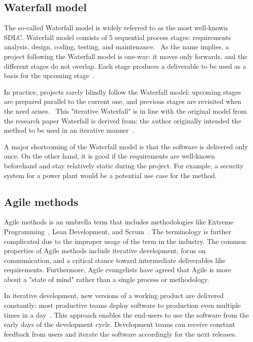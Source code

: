 \subsection{Waterfall model}

The so-called Waterfall model is widely referred to as the most well-known SDLC. Waterfall model consists of 5 sequential process stages: requirements analysis, design, coding, testing, and maintenance.~\cite{alshamrani_comparison_2015} As the name implies, a project following the Waterfall model is one-way: it moves only forwards, and the different stages do not overlap. Each stage produces a deliverable to be used as a basis for the upcoming stage~\cite{balaji_waterfall_2012}. 

In practice, projects rarely blindly follow the Waterfall model: upcoming stages are prepared parallel to the current one, and previous stages are revisited when the need arises.~\cite{sommerville_software_2016} This "iterative Waterfall" is in line with the original model from the research paper Waterfall is derived from: the author originally intended the method to be used in an iterative manner~\cite{royce_managing_nodate}.

A major shortcoming of the Waterfall model is that the software is delivered only once. On the other hand, it is good if the requirements are well-known beforehand and stay relatively static during the project. For example, a security system for a power plant would be a potential use case for the method.

\subsection{Agile methods}

Agile methods is an umbrella term that includes methodologies like Extreme Programming~\cite{wells_don_extreme_2018}, Lean Development, and Scrum~\cite{scrumorg_home_nodate}. The terminology is further complicated due to the improper usage of the term in the industry. The common properties of Agile methods include iterative development, focus on communication, and a critical stance toward intermediate deliverables like requirements. Furthermore, Agile evangelists have agreed that Agile is more about a "state of mind" rather than a single process or methodology.~\cite{cohen_introduction_2004}

In iterative development, new versions of a working product are delivered constantly: most productive teams deploy software to production even multiple times in a day~\cite{forsgren_accelerate_2018}. This approach enables the end-users to use the software from the early days of the development cycle. Development teams can receive constant feedback from users and iterate the software accordingly for the next releases.~\cite{balaji_waterfall_2012}

